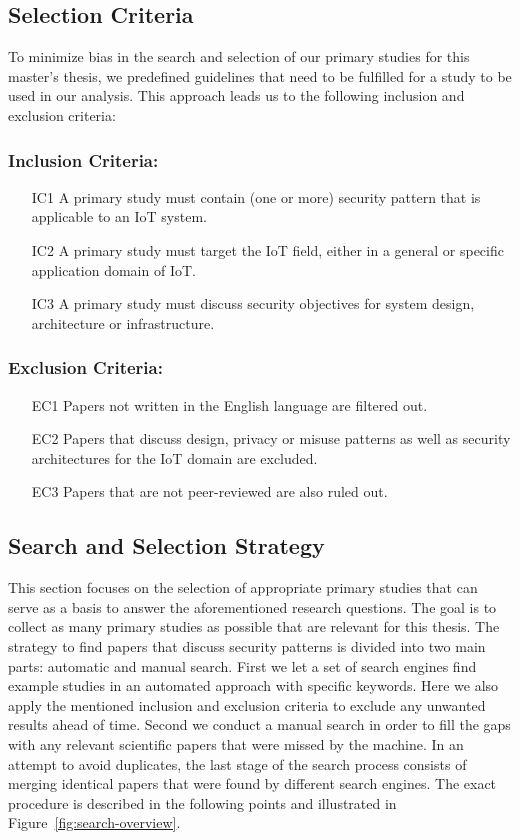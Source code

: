 \subsection{Selection Criteria}
To minimize bias in the search and selection of our primary studies for this master's thesis, we predefined guidelines that need to be fulfilled for a study to be used in our analysis. This approach leads us to the following inclusion and exclusion criteria:

\subsubsection{Inclusion Criteria:}\label{subsubsec:ICs}
\begin{enumerate}
	\item[IC1] A primary study must contain (one or more) security pattern that is applicable to an IoT system.
	\item[IC2] A primary study must target the IoT field, either in a general or specific application domain of IoT.
	\item[IC3] A primary study must discuss security objectives for system design, architecture or infrastructure.
\end{enumerate}

\subsubsection{Exclusion Criteria:}\label{subsubsec:ECs}
\begin{enumerate}
	\item[EC1] Papers not written in the English language are filtered out.
	\item[EC2] Papers that discuss design, privacy or misuse patterns as well as security architectures for the IoT domain are excluded.
	\item[EC3] Papers that are not peer-reviewed are also ruled out. 
\end{enumerate}
 

\subsection{Search and Selection Strategy}
This section focuses on the selection of appropriate primary studies that can serve as a basis to answer the aforementioned research questions. The goal is to collect as many primary studies as possible that are relevant for this thesis. The strategy to find papers that discuss security patterns is divided into two main parts: automatic and manual search. First we let a set of search engines find example studies in an automated approach with specific keywords. Here we also apply the mentioned inclusion and exclusion criteria to exclude any unwanted results ahead of time. Second we conduct a manual search in order to fill the gaps with any relevant scientific papers that were missed by the machine. In an attempt to avoid duplicates, the last stage of the search process consists of merging identical papers that were found by different search engines. The exact procedure is described in the following points and illustrated in Figure~\ref{fig:search-overview}.

